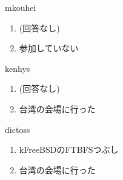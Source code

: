 \begin{prework}{ mkouhei }
  \begin{enumerate}
  \item (回答なし)
  \item 参加していない
  \end{enumerate}
\end{prework}

\begin{prework}{ kenhys }
  \begin{enumerate}
  \item (回答なし)
  \item 台湾の会場に行った
  \end{enumerate}
\end{prework}

\begin{prework}{ dictoss }
  \begin{enumerate}
  \item kFreeBSDのFTBFSつぶし
  \item 台湾の会場に行った
  \end{enumerate}
\end{prework}

